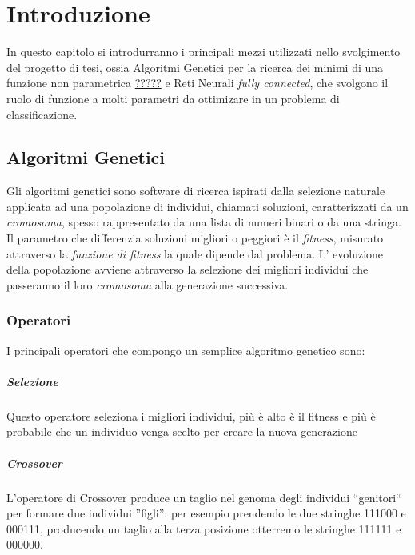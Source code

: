 \documentclass[12pt,a4paper]{report}
\begin{document}
\thispagestyle{empty}
\clearpage\null\newpage

\tableofcontents


\chapter{Introduzione}

In questo capitolo si introdurranno i principali mezzi utilizzati nello svolgimento del progetto di tesi, ossia Algoritmi Genetici per la ricerca dei minimi di una funzione non parametrica \underline{?????} e Reti Neurali \textit{fully connected}, che svolgono il ruolo di funzione a molti parametri da ottimizare in un problema di classificazione.

\section{Algoritmi Genetici}\label{alg-gen}

Gli algoritmi genetici sono software di ricerca ispirati dalla selezione naturale applicata ad una popolazione di individui, chiamati soluzioni, caratterizzati da un \textit{cromosoma}, spesso rappresentato da una lista di numeri binari o da una  stringa.
Il parametro che differenzia soluzioni migliori o peggiori è il \textit{fitness}, misurato attraverso la \textit{funzione di fitness} la quale dipende dal problema.
L' evoluzione della popolazione avviene attraverso la selezione dei migliori individui che passeranno il loro \textit{cromosoma} alla generazione successiva.

\subsection{Operatori}

\cite{genetic-algorithm-mitchell}
I principali operatori che compongo un semplice algoritmo genetico sono:

\paragraph{Selezione} Questo operatore seleziona i migliori individui, più è alto è il fitness e più è probabile che un individuo venga scelto per creare la nuova generazione

\paragraph{Crossover} L'operatore di Crossover produce un taglio nel genoma degli individui ``genitori`` per formare due individui ''figli'': per esempio prendendo le due stringhe 111000 e 000111, producendo un taglio alla terza posizione otterremo le stringhe  111111 e 000000.
\end{document}
